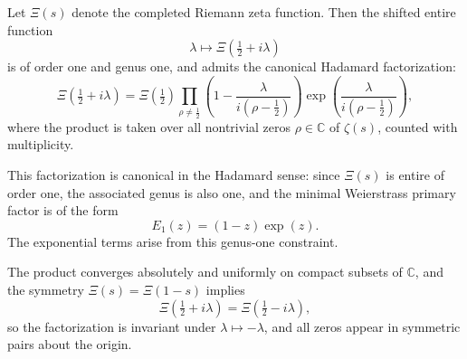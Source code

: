 \begin{lemma}
\label{lem:hadamard-linear-form}
Let \( \Xi(s) \) denote the completed Riemann zeta function. Then the shifted entire function
\[
\lambda \mapsto \Xi\left( \tfrac{1}{2} + i\lambda \right)
\]
is of order one and genus one, and admits the canonical Hadamard factorization:
\[
\Xi\left( \tfrac{1}{2} + i\lambda \right)
= \Xi\left( \tfrac{1}{2} \right)
\prod_{\rho \ne \tfrac{1}{2}} \left( 1 - \frac{\lambda}{i(\rho - \tfrac{1}{2})} \right)
\exp\left( \frac{\lambda}{i(\rho - \tfrac{1}{2})} \right),
\]
where the product is taken over all nontrivial zeros \( \rho \in \mathbb{C} \) of \( \zeta(s) \), counted with multiplicity.

\medskip
\noindent
This factorization is canonical in the Hadamard sense: since \( \Xi(s) \) is entire of order one, the associated genus is also one, and the minimal Weierstrass primary factor is of the form
\[
E_1(z) = (1 - z) \exp(z).
\]
The exponential terms arise from this genus-one constraint.

\medskip
\noindent
The product converges absolutely and uniformly on compact subsets of \( \mathbb{C} \), and the symmetry \( \Xi(s) = \Xi(1 - s) \) implies
\[
\Xi\left( \tfrac{1}{2} + i\lambda \right) = \Xi\left( \tfrac{1}{2} - i\lambda \right),
\]
so the factorization is invariant under \( \lambda \mapsto -\lambda \), and all zeros appear in symmetric pairs about the origin.
\end{lemma}
%  